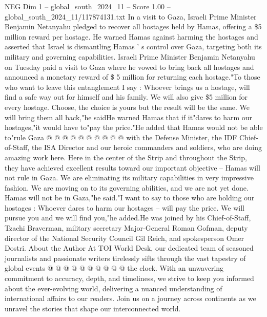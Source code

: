\begin{textsample}{NEG Dim 1 – global\_south\_2024\_11 – Score 1.00 – global\_south\_2024\_11/117874131.txt}  \label{ex:f1_neg_205}
In a visit to Gaza, Israeli Prime Minister Benjamin Netanyahu pledged to recover all hostages held by Hamas, offering a \$5 million reward per hostage.
He warned Hamas against harming the hostages and asserted that Israel is dismantling Hamas ' s control over Gaza, targeting both its military and governing capabilities.
Israeli Prime Minister Benjamin Netanyahu on Tuesday paid a visit to Gaza where he vowed to bring back all hostages and announced a monetary reward of \$ 5 million for returning each hostage."To those who want to leave this entanglement I say : Whoever brings us a hostage, will find a safe way out for himself and his family.
We will also give \$5 million for every hostage.
Choose, the choice is yours but the result will be the same.
We will bring them all back,"he saidHe warned Hamas that if it"dares to harm our hostages,"it would have to"pay the price."He added that Hamas would not be able to"rule Gaza @ @ @ @ @ @ @ @ @ @ with the Defense Minister, the IDF Chief-of-Staff, the ISA Director and our heroic commanders and soldiers, who are doing amazing work here.
Here in the center of the Strip and throughout the Strip, they have achieved excellent results toward our important objective -- Hamas will not rule in Gaza.
We are eliminating its military capabilities in very impressive fashion.
We are moving on to its governing abilities, and we are not yet done.
Hamas will not be in Gaza,"he said."I want to say to those who are holding our hostages : Whoever dares to harm our hostages -- will pay the price.
We will pursue you and we will find you,"he added.He was joined by his Chief-of-Staff, Tzachi Braverman, military secretary Major-General Roman Gofman, deputy director of the National Security Council Gil Reich, and spokesperson Omer Dostri.
About the Author At TOI World Desk, our dedicated team of seasoned journalists and passionate writers tirelessly sifts through the vast tapestry of global events @ @ @ @ @ @ @ @ @ @ the clock.
With an unwavering commitment to accuracy, depth, and timeliness, we strive to keep you informed about the ever-evolving world, delivering a nuanced understanding of international affairs to our readers.
Join us on a journey across continents as we unravel the stories that shape our interconnected world.

\end{textsample}
